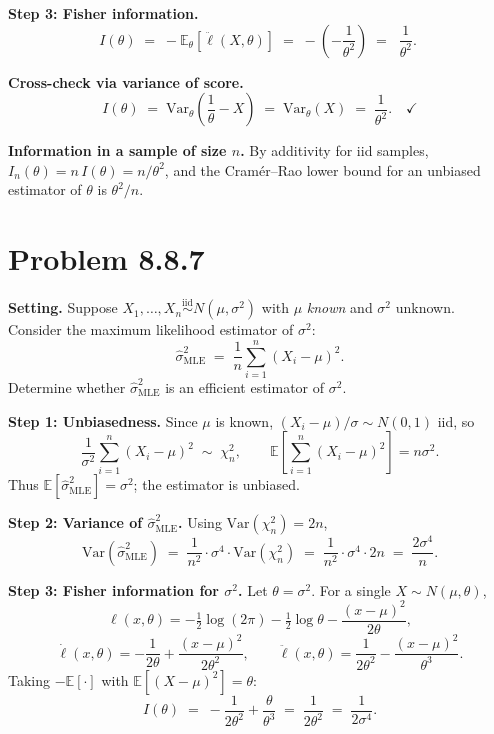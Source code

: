 \documentclass[11pt]{article}
\newcommand{\E}{\mathbb{E}}
\newcommand{\Var}{\mathrm{Var}}
\newcommand{\iid}{\stackrel{\text{iid}}{\sim}}
\begin{document}
\textbf{Step 3: Fisher information.}
\begin{equation}\label{eq:IthetaExp}
I(\theta) \;=\; -\E_\theta[\ddot\ell(X,\theta)] \;=\; -\left(-\frac{1}{\theta^2}\right) \;=\; \boxed{\;\frac{1}{\theta^2}.\;}
\end{equation}

\textbf{Cross-check via variance of score.}
\[
I(\theta) \;=\; \Var_\theta\!\left(\frac{1}{\theta}-X\right) \;=\; \Var_\theta(X) \;=\; \frac{1}{\theta^2}. \quad\checkmark
\]

\textbf{Information in a sample of size $n$.} By additivity for iid samples, $I_n(\theta) = n\,I(\theta) = n/\theta^2$, and the Cram\'er--Rao lower bound for an unbiased estimator of $\theta$ is $\theta^2/n$.

\bigskip
\section*{Problem 8.8.7}
\textbf{Setting.} Suppose $X_1,\dots,X_n \iid N(\mu,\sigma^2)$ with $\mu$ \emph{known} and $\sigma^2$ unknown. Consider the maximum likelihood estimator of $\sigma^2$:
\[
\hat\sigma^2_{\text{MLE}} \;=\; \frac{1}{n}\sum_{i=1}^n (X_i-\mu)^2.
\]
Determine whether $\hat\sigma^2_{\text{MLE}}$ is an efficient estimator of $\sigma^2$.

\textbf{Step 1: Unbiasedness.} Since $\mu$ is known, $(X_i-\mu)/\sigma \sim N(0,1)$ iid, so
\[
\frac{1}{\sigma^2}\sum_{i=1}^n (X_i-\mu)^2 \;\sim\; \chi^2_n, \qquad \E\!\left[\sum_{i=1}^n (X_i-\mu)^2\right] = n\sigma^2.
\]
Thus $\E[\hat\sigma^2_{\text{MLE}}] = \sigma^2$; the estimator is unbiased.

\textbf{Step 2: Variance of $\hat\sigma^2_{\text{MLE}}$.} Using $\Var(\chi^2_n)=2n$,
\begin{equation}\label{eq:varMLE}
\Var(\hat\sigma^2_{\text{MLE}}) \;=\; \frac{1}{n^2}\cdot \sigma^4 \cdot \Var(\chi^2_n) \;=\; \frac{1}{n^2}\cdot \sigma^4 \cdot 2n \;=\; \frac{2\sigma^4}{n}.
\end{equation}

\textbf{Step 3: Fisher information for $\sigma^2$.} Let $\theta=\sigma^2$. For a single $X\sim N(\mu,\theta)$,
\[
\ell(x,\theta) = -\tfrac{1}{2}\log(2\pi) -\tfrac{1}{2}\log\theta -\frac{(x-\mu)^2}{2\theta},
\]
\[
\dot\ell(x,\theta) = -\frac{1}{2\theta}+\frac{(x-\mu)^2}{2\theta^2}, \qquad \ddot\ell(x,\theta) = \frac{1}{2\theta^2}-\frac{(x-\mu)^2}{\theta^3}.
\]
Taking $-\E[\cdot]$ with $\E[(X-\mu)^2]=\theta$:
\begin{equation}\label{eq:ISigma2}
I(\theta) \;=\; -\frac{1}{2\theta^2} + \frac{\theta}{\theta^3} \;=\; \frac{1}{2\theta^2} \;=\; \frac{1}{2\sigma^4}.
\end{equation}
\end{document}
